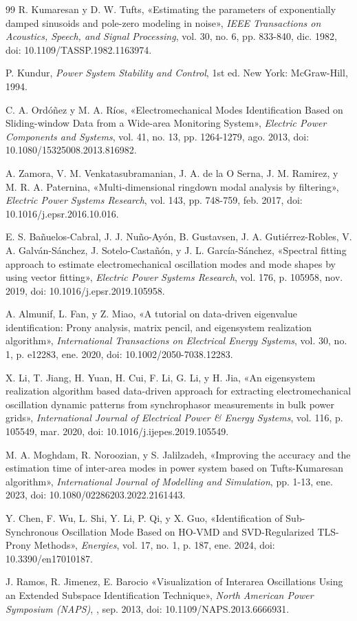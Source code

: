 \begin{thebibliography}{99}
R. Kumaresan y D. W. Tufts, «Estimating the parameters of exponentially damped sinusoids and pole-zero modeling in noise», \emph{IEEE Transactions on Acoustics, Speech, and Signal Processing}, vol. 30, no. 6, pp. 833-840, dic. 1982, doi: 10.1109/TASSP.1982.1163974.

P. Kundur, \emph{Power System Stability and Control}, 1st ed. New York: McGraw-Hill, 1994.

C. A. Ordóñez y M. A. Ríos, «Electromechanical Modes Identification Based on Sliding-window Data from a Wide-area Monitoring System», \emph{Electric Power Components and Systems}, vol. 41, no. 13, pp. 1264-1279, ago. 2013, doi: 10.1080/15325008.2013.816982.

A. Zamora, V. M. Venkatasubramanian, J. A. de la O Serna, J. M. Ramirez, y M. R. A. Paternina, «Multi-dimensional ringdown modal analysis by filtering», \emph{Electric Power Systems Research}, vol. 143, pp. 748-759, feb. 2017, doi: 10.1016/j.epsr.2016.10.016.

E. S. Bañuelos-Cabral, J. J. Nuño-Ayón, B. Gustavsen, J. A. Gutiérrez-Robles, V. A. Galván-Sánchez, J. Sotelo-Castañón, y J. L. García-Sánchez, «Spectral fitting approach to estimate electromechanical oscillation modes and mode shapes by using vector fitting», \emph{Electric Power Systems Research}, vol. 176, p. 105958, nov. 2019, doi: 10.1016/j.epsr.2019.105958.

A. Almunif, L. Fan, y Z. Miao, «A tutorial on data-driven eigenvalue identification: Prony analysis, matrix pencil, and eigensystem realization algorithm», \emph{International Transactions on Electrical Energy Systems}, vol. 30, no. 1, p. e12283, ene. 2020, doi: 10.1002/2050-7038.12283.

X. Li, T. Jiang, H. Yuan, H. Cui, F. Li, G. Li, y H. Jia, «An eigensystem realization algorithm based data-driven approach for extracting electromechanical oscillation dynamic patterns from synchrophasor measurements in bulk power grids», \emph{International Journal of Electrical Power \& Energy Systems}, vol. 116, p. 105549, mar. 2020, doi: 10.1016/j.ijepes.2019.105549.

M. A. Moghdam, R. Noroozian, y S. Jalilzadeh, «Improving the accuracy and the estimation time of inter-area modes in power system based on Tufts-Kumaresan algorithm», \emph{International Journal of Modelling and Simulation}, pp. 1-13, ene. 2023, doi: 10.1080/02286203.2022.2161443.

Y. Chen, F. Wu, L. Shi, Y. Li, P. Qi, y X. Guo, «Identification of Sub-Synchronous Oscillation Mode Based on HO-VMD and SVD-Regularized TLS-Prony Methods», \emph{Energies}, vol. 17, no. 1, p. 187, ene. 2024, doi: 10.3390/en17010187.

J. Ramos, R. Jimenez, E. Barocio «Visualization of Interarea Oscillations Using an Extended Subspace Identification Technique», \emph{North American Power Symposium (NAPS)}, , sep. 2013, doi: 10.1109/NAPS.2013.6666931.

\end{thebibliography}







